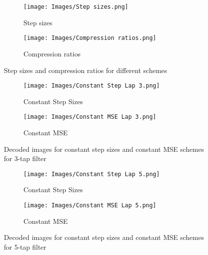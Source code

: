\begin{figure}
\centering
\begin{subfigure}{.5\textwidth}
  \centering
  \texttt{[image: Images/Step sizes.png]}
  \caption{Step sizes}
  \label{fig:step sizes}
\end{subfigure}%
\begin{subfigure}{.5\textwidth}
  \centering
  \texttt{[image: Images/Compression ratios.png]}
  \caption{Compression ratios}
  \label{fig:compression ratios}
\end{subfigure}
\caption{Step sizes and compression ratios for different schemes}
\label{fig:step size and compression ratios}
\end{figure}

\begin{figure}
\centering
\begin{subfigure}{.5\textwidth}
  \centering
  \texttt{[image: Images/Constant Step Lap 3.png]}
  \caption{Constant Step Sizes}
  \label{fig:const_step_lap3}
\end{subfigure}%
\begin{subfigure}{.5\textwidth}
  \centering
  \texttt{[image: Images/Constant MSE Lap 3.png]}
  \caption{Constant MSE}
  \label{fig:const_mse_lap3}
\end{subfigure}
\caption{Decoded images for constant step sizes and constant MSE schemes for 3-tap filter}
\label{fig:lap3}
\end{figure}


\begin{figure}
\centering
\begin{subfigure}{.5\textwidth}
  \centering
  \texttt{[image: Images/Constant Step Lap 5.png]}
  \caption{Constant Step Sizes}
  \label{fig:const_step_lap5}
\end{subfigure}%
\begin{subfigure}{.5\textwidth}
  \centering
  \texttt{[image: Images/Constant MSE Lap 5.png]}
  \caption{Constant MSE}
  \label{fig:const_mse_lap5}
\end{subfigure}
\caption{Decoded images for constant step sizes and constant MSE schemes for 5-tap filter}
\label{fig:lap5}
\end{figure}